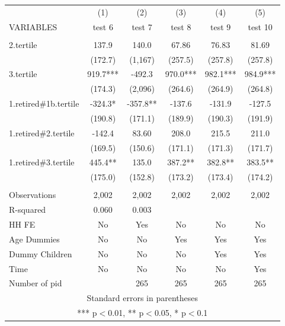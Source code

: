 \begin{tabular}{lccccc} \hline
 & (1) & (2) & (3) & (4) & (5) \\
VARIABLES & test 6 & test 7 & test 8 & test 9 & test 10 \\ \hline
 &  &  &  &  &  \\
2.tertile & 137.9 & 140.0 & 67.86 & 76.83 & 81.69 \\
 & (172.7) & (1,167) & (257.5) & (257.8) & (257.8) \\
3.tertile & 919.7*** & -492.3 & 970.0*** & 982.1*** & 984.9*** \\
 & (174.3) & (2,096) & (264.6) & (264.9) & (264.8) \\
1.retired\#1b.tertile & -324.3* & -357.8** & -137.6 & -131.9 & -127.5 \\
 & (190.8) & (171.1) & (189.9) & (190.3) & (191.9) \\
1.retired\#2.tertile & -142.4 & 83.60 & 208.0 & 215.5 & 211.0 \\
 & (169.5) & (150.6) & (171.1) & (171.3) & (171.7) \\
1.retired\#3.tertile & 445.4** & 135.0 & 387.2** & 382.8** & 383.5** \\
 & (175.0) & (152.8) & (173.2) & (173.4) & (174.2) \\
 &  &  &  &  &  \\
Observations & 2,002 & 2,002 & 2,002 & 2,002 & 2,002 \\
R-squared & 0.060 & 0.003 &  &  &  \\
HH FE & No & Yes & No & No & No \\
Age Dummies & No & No & Yes & Yes & Yes \\
Dummy Children & No & No & No & Yes & Yes \\
Time & No & No & No & No & Yes \\
 Number of pid &  & 265 & 265 & 265 & 265 \\ \hline
\multicolumn{6}{c}{ Standard errors in parentheses} \\
\multicolumn{6}{c}{ *** p$<$0.01, ** p$<$0.05, * p$<$0.1} \\
\end{tabular}
